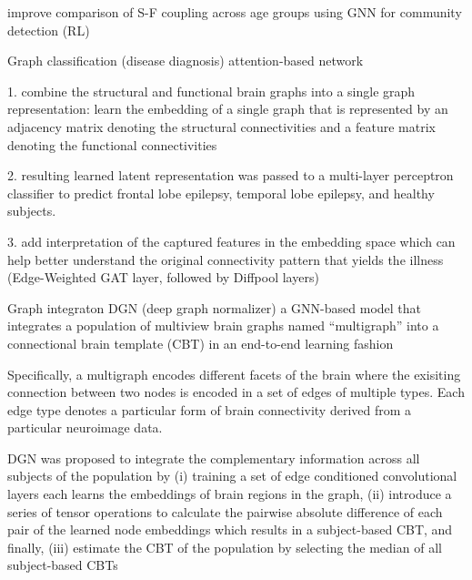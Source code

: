 improve comparison of S-F coupling 
across age groups
using GNN for community detection (RL)




Graph classification (disease diagnosis)
attention-based network

1. combine the structural and functional brain graphs into a single 
graph representation:
learn the embedding of a single graph that is represented by
an adjacency matrix denoting the structural connectivities
and a feature matrix denoting the functional connectivities

2.  resulting learned latent representation was passed to
a multi-layer perceptron classifier to predict frontal lobe
epilepsy, temporal lobe epilepsy, and healthy subjects.

3. add interpretation of the captured features in the embedding space 
which can help better understand the original connectivity pattern that 
yields the illness
(Edge-Weighted GAT layer, followed by Diffpool layers)



Graph integraton
DGN (deep graph normalizer)
a GNN-based model that integrates a population of multiview brain
graphs named “multigraph” into a connectional brain template (CBT) 
in an end-to-end learning fashion

Specifically, a multigraph encodes different facets of the brain where
the exisiting connection between two nodes is encoded in
a set of edges of multiple types. Each edge type denotes a
particular form of brain connectivity derived from a particular neuroimage data. 

DGN was proposed to integrate the complementary information across all subjects of 
the population by 
(i) training a set of edge conditioned convolutional
layers each learns the embeddings of brain regions in the
graph, 
(ii) introduce a series of tensor operations to calculate
the pairwise absolute difference of each pair of the learned
node embeddings which results in a subject-based CBT, and
finally, 
(iii) estimate the CBT of the population by selecting
the median of all subject-based CBTs